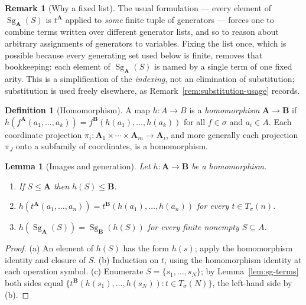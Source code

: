 \documentclass[11pt]{article}
\theoremstyle{mainplain}
\newtheorem{lemma}[theorem]{Lemma}
\theoremstyle{mainroman}
\theoremstyle{definition}
\newtheorem{definition}[theorem]{Definition}
\newtheorem{remark}[theorem]{Remark}
\newcommand{\alphlabels}{\renewcommand{\labelenumi}{\textup{(\alph{enumi})}}%
  \renewcommand{\theenumi}{\alph{enumi}}}
\providecommand{\tightlist}{\setlength{\itemsep}{0pt}\setlength{\parskip}{0pt}}
\numberwithin{equation}{section}
\DeclareMathOperator{\Sg}{Sg}
\newcommand{\bA}{\mathbf A}
\newcommand{\bB}{\mathbf B}
\newcommand{\Tm}{T_\sigma}
\begin{document}
\begin{remark}[Why a fixed list]\label{rem:fixed-list}
The usual formulation --- every element of $\Sg_{\bA}(S)$ is $t^{\bA}$ applied
to \emph{some} finite tuple of generators --- forces one to combine terms
written over different generator lists, and so to reason about arbitrary
assignments of generators to variables. Fixing the list once, which is possible
because every generating set used below is finite, removes that bookkeeping:
each element of $\Sg_{\bA}(S)$ is named by a single term of one fixed arity.
This is a simplification of the \emph{indexing}, not an elimination of
substitution; substitution is used freely elsewhere, as
Remark~\ref{rem:substitution-usage} records.
\end{remark}

\begin{definition}[Homomorphism]\label{def:hom}
A map $h:A\to B$ is a \emph{homomorphism} $\bA\to\bB$ if
$h(f^{\bA}(a_1,\dots,a_k))=f^{\bB}(h(a_1),\dots,h(a_k))$ for all $f\in\sigma$
and $a_i\in A$. Each coordinate projection
$\pi_i:\bA_1\times\cdots\times\bA_m\to\bA_i$, and more generally each
projection $\pi_J$ onto a subfamily of coordinates, is a homomorphism.
\end{definition}

\begin{lemma}[Images and generation]\label{lem:hom-image}
Let $h:\bA\to\bB$ be a homomorphism.
\begin{enumerate}\alphlabels\tightlist
\item If $S\le\bA$ then $h(S)\le\bB$.
\item $h(t^{\bA}(a_1,\dots,a_n))=t^{\bB}(h(a_1),\dots,h(a_n))$ for every
      $t\in\Tm(n)$.
\item $h(\Sg_{\bA}(S))=\Sg_{\bB}(h(S))$ for every finite nonempty
      $S\subseteq A$.
\end{enumerate}
\end{lemma}
\begin{proof}
(a) An element of $h(S)$ has the form $h(s)$; apply the homomorphism identity
and closure of $S$. (b) Induction on $t$, using the homomorphism identity at
each operation symbol. (c) Enumerate $S=\{s_1,\dots,s_N\}$; by
Lemma~\ref{lem:sg-terms} both sides equal
$\{t^{\bB}(h(s_1),\dots,h(s_N)):t\in\Tm(N)\}$, the left-hand side by (b).
\end{proof}
\end{document}
